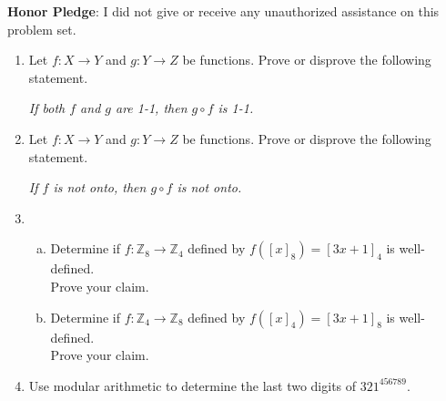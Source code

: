 \documentclass[12pt]{amsart}
\begin{document}
\vspace{0.3in}
\noindent
{\color{red}{This problem set is entirely optional, but its score will replace your lowest problem set score.}}

\vfill
\noindent
\textbf{Honor Pledge}: I did not give or receive any unauthorized assistance on this problem set.

\vspace{0.5in}
\hfill\makebox[3.0in]{\hrulefill}

\hfill{}

\newpage
\begin{enumerate}[{\bfseries 1.}]
\item Let $f: X\to Y$ and $g: Y\to Z$ be functions.  Prove or disprove the following statement.

	\vspace{0.1in}
	\begin{center}
	\noindent
	\textit{If both $f$ and $g$ are 1-1, then $g\circ f$ is 1-1.}
	\end{center}
	
	\vfill

\vspace{0.1in}
\item Let $f: X\to Y$ and $g: Y\to Z$ be functions.  Prove or disprove the following statement.

	\vspace{0.1in}
	\begin{center}
	\noindent
	\textit{If $f$ is not onto, then $g\circ f$ is not onto.}
	\end{center}
	
	\vfill

\newpage
\item\begin{enumerate}[(a)]
	\item Determine if $f: \mathbb{Z}_{8}\to\mathbb{Z}_{4}$ defined by $f([x]_{8})=[3x+1]_{4}$ is well-defined.\\  Prove your claim.
		\vfill

	\vspace{0.1in}
	\item Determine if $f: \mathbb{Z}_{4}\to\mathbb{Z}_{8}$ defined by $f([x]_{4})=[3x+1]_{8}$ is well-defined.\\  Prove your claim.
		\vfill

	\end{enumerate}

\newpage
\item Use modular arithmetic to determine the last two digits of $321^{456789}$.


\end{enumerate}
\end{document}
